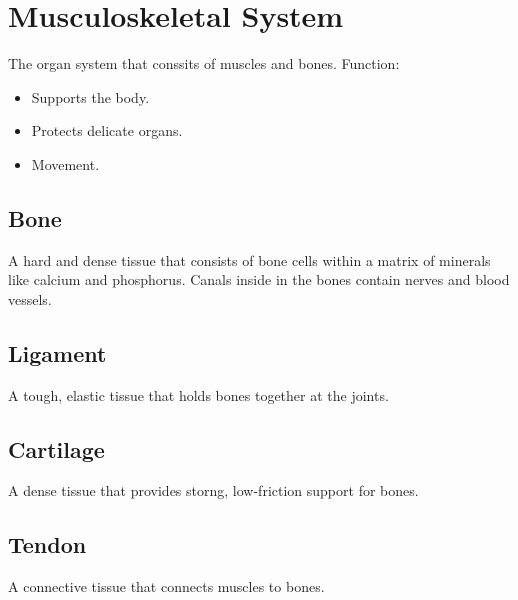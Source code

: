 \documentclass[12pt]{report}
\begin{document}
\section{Musculoskeletal System}
\begin{definition}
    The organ system that conssits of muscles and bones. Function: 
    \begin{itemize}
        \item{Supports the body.}
        \item{Protects delicate organs.}
        \item{Movement.}
    \end{itemize}
\end{definition}

\subsection{Bone}
\begin{definition}[Bone]
    A hard and dense tissue that consists of bone cells within a matrix of minerals like calcium and phosphorus. Canals inside in the bones contain nerves and blood vessels.
\end{definition}

\subsection{Ligament}
\begin{definition}[Ligament]
    A tough, elastic tissue that holds bones together at the joints. 
\end{definition}

\subsection{Cartilage}
\begin{definition}[Cartilage]
    A dense tissue that provides storng, low-friction support for bones.    
\end{definition}

\subsection{Tendon}
\begin{definition}[Tendon]
    A connective tissue that connects muscles to bones.
\end{definition}
\end{document}
